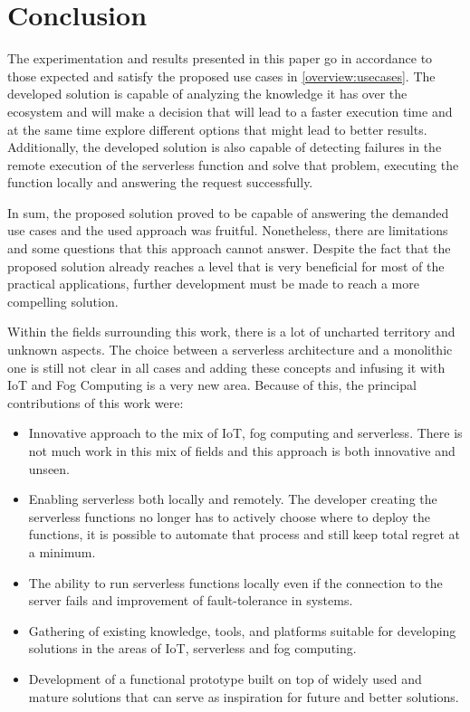 \documentclass[conference]{IEEEtran}
\begin{document}
\section{Conclusion}
The experimentation and results presented in this paper go in accordance to
those expected and satisfy the proposed use cases in \ref{overview:usecases}. The
developed solution is capable of analyzing the knowledge it has over the ecosystem
and will make a decision that will lead to a faster execution time and at the
same time explore different options that might lead to better results.
Additionally, the developed solution is also capable of detecting failures in the
remote execution of the serverless function and solve that problem, executing the
function locally and answering the request successfully.

In sum, the proposed solution proved to be capable of answering the demanded use
cases and the used approach was fruitful. Nonetheless, there are limitations and
some questions that this approach cannot answer.
Despite the fact that the proposed solution already reaches a level that is very
beneficial for most of the practical applications, further development must be
made to reach a more compelling solution.

Within the fields surrounding this work, there is a lot of uncharted
territory and unknown aspects. The choice between a serverless architecture and a
monolithic one is still not clear in all cases and adding these concepts and
infusing it with IoT and Fog Computing is a very new area. Because of this, the
principal contributions of this work were:

\begin{itemize}
    \item Innovative approach to the mix of IoT, fog computing and serverless. There is not much work in this mix of fields and this approach is both innovative
        and unseen.

    \item Enabling serverless both locally and remotely. The developer creating the serverless functions no longer has to actively choose where to deploy the functions, it is possible to automate that process and still keep total
        regret at a minimum.

    \item The ability to run serverless functions locally even if the connection to the server fails and improvement of fault-tolerance in systems.

    \item Gathering of existing knowledge, tools, and platforms suitable for developing solutions in the areas of IoT, serverless and fog computing.

    \item Development of a functional prototype built on top of widely used and mature solutions that can serve as inspiration for future and better solutions.
\end{itemize}
\end{document}
